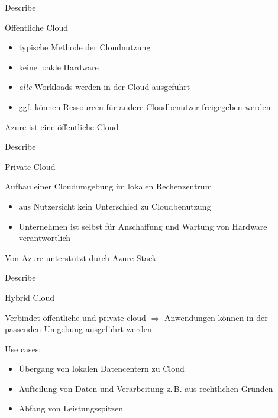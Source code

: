 \documentclass{scrartcl}
\newenvironment{flashcard}[2][]{%
    #1
    \vfill
    \centerline{\Large{#2}}
    \vfill
\newpage
}
{\newpage}
\begin{document}
    \begin{flashcard}[Describe]{Öffentliche Cloud}
        \begin{itemize}
            \item typische Methode der Cloudnutzung
            \item keine loakle Hardware
            \item \emph{alle} Workloads werden in der Cloud ausgeführt
            \item ggf. können Ressourcen für andere Cloudbenutzer freigegeben werden
        \end{itemize}

        \vspace{5mm}
        Azure ist eine öffentliche Cloud
    \end{flashcard}

    \begin{flashcard}[Describe]{Private Cloud}
        Aufbau einer Cloudumgebung im lokalen Rechenzentrum

        \begin{itemize}
            \item aus Nutzersicht kein Unterschied zu Cloudbenutzung
            \item Unternehmen ist selbst für Anschaffung und Wartung von Hardware verantwortlich
        \end{itemize}

        \vspace{5mm}
        Von Azure unterstützt durch Azure Stack

    \end{flashcard}

    \begin{flashcard}[Describe]{Hybrid Cloud}
        Verbindet öffentliche und private cloud\newline
        $\Rightarrow$ Anwendungen können in der passenden Umgebung ausgeführt werden

        \vspace{5mm}
        Use cases:
        \begin{itemize}
            \item Übergang von lokalen Datencentern zu Cloud
            \item Aufteilung von Daten und Verarbeitung z.\,B. aus rechtlichen Gründen
            \item Abfang von Leistungsspitzen
        \end{itemize}

    \end{flashcard}
\end{document}
